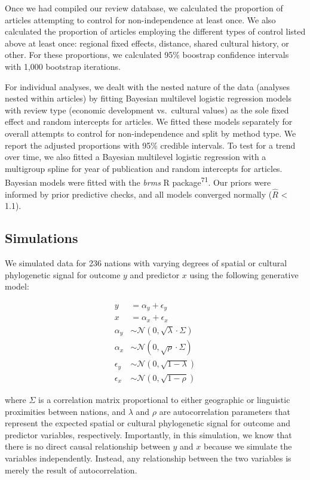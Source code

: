 \documentclass[
  man,floatsintext]{apa6}
\begin{document}
Once we had compiled our review database, we calculated the proportion of articles attempting to control for non-independence at least once. We also calculated the proportion of articles employing the different types of control listed above at least once: regional fixed effects, distance, shared cultural history, or other. For these proportions, we calculated 95\% boostrap confidence intervals with 1,000 bootstrap iterations.

For individual analyses, we dealt with the nested nature of the data (analyses nested within articles) by fitting Bayesian multilevel logistic regression models with review type (economic development vs.~cultural values) as the sole fixed effect and random intercepts for articles. We fitted these models separately for overall attempts to control for non-independence and split by method type. We report the adjusted proportions with 95\% credible intervals. To test for a trend over time, we also fitted a Bayesian multilevel logistic regression with a multigroup spline for year of publication and random intercepts for articles. Bayesian models were fitted with the \emph{brms} R package\textsuperscript{71}. Our priors were informed by prior predictive checks, and all models converged normally (\(\hat{R}\) \textless{} 1.1).

\hypertarget{simulations}{%
\subsection{Simulations}\label{simulations}}

We simulated data for 236 nations with varying degrees of spatial or cultural phylogenetic signal for outcome \(y\) and predictor \(x\) using the following generative model:

\[
\begin{aligned}
y &= \alpha_y + \epsilon_y \\
x &= \alpha_x + \epsilon_x \\
\alpha_y &\sim \mathcal{N}(0, \sqrt{\lambda} \cdot \Sigma) \\
\alpha_x &\sim \mathcal{N}(0, \sqrt{\rho} \cdot \Sigma) \\
\epsilon_y &\sim \mathcal{N}(0, \sqrt{1 - \lambda}) \\
\epsilon_x &\sim \mathcal{N}(0, \sqrt{1 - \rho})
\end{aligned}
\]

where \(\Sigma\) is a correlation matrix proportional to either geographic or linguistic proximities between nations, and \(\lambda\) and \(\rho\) are autocorrelation parameters that represent the expected spatial or cultural phylogenetic signal for outcome and predictor variables, respectively. Importantly, in this simulation, we know that there is no direct causal relationship between \(y\) and \(x\) because we simulate the variables independently. Instead, any relationship between the two variables is merely the result of autocorrelation.
\end{document}
